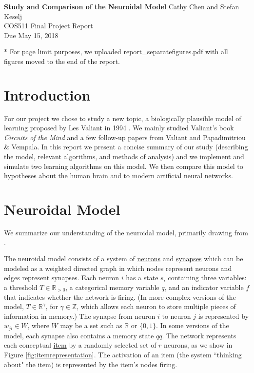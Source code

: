 \documentclass[letterpaper, 12pt]{article}
\begin{document}
\noindent
\textbf{Study and Comparison of the Neuroidal Model} \hfill \newline Cathy Chen and Stefan Keselj \\
COS511 Final Project Report \\
Due May 15, 2018\newline

* For page limit purposes, we uploaded report\_separatefigures.pdf with all figures moved to the end of the report.

\section{Introduction}
For our project we chose to study a new topic, a biologically plausible model of learning proposed by Les Valiant in 1994 \cite{valiant_circuits_1994}. We mainly studied Valiant's book \textit{Circuits of the Mind} and a few follow-up papers from Valiant and Papadimitriou \& Vempala. In this report we present a concise summary of our study (describing the model, relevant algorithms, and methods of analysis) and we implement and simulate two learning algorithms on this model. We then compare this model to hypotheses about the human brain and to modern artificial neural networks.

\section{Neuroidal Model}\label{sec:model}
We summarize our understanding of the neuroidal model, primarily drawing from \cite{valiant_circuits_1994, valiant_memorization_2005, papadimitriou_cortical_2015}.

The neuroidal model consists of a system of \underline{neurons} and \underline{synapses} which can be modeled as a weighted directed graph in which nodes represent neurons and edges represent synapses. Each neuron $i$ has a state $s_i$ containing three variables: a threshold $T\in\mathbb{R}_{>0}$, a categorical memory variable $q$, and an indicator variable $f$ that indicates whether the network is firing. (In more complex versions of the model, $T\in\mathbb{R}^\gamma$, for $\gamma\in\mathbb{Z}$, which allows each neuron to store multiple pieces of information in memory.) The synapse from neuron $i$ to neuron $j$ is represented by $w_{ji}\in W$, where $W$ may be a set such as $\mathbb{R}$ or $\{0,1\}$. In some versions of the model, each synapse also contains a memory state $qq$. The network represents each conceptual \underline{item} by a randomly selected set of $r$ neurons, as we show in Figure \ref{fig:itemrepresentation}. The activation of an item (the system ``thinking about" the item) is represented by the item's nodes firing.
\end{document}
